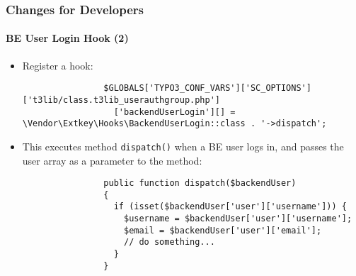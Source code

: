 \begin{frame}[fragile]
	\frametitle{Changes for Developers}
	\framesubtitle{BE User Login Hook (2)}

	\lstset{basicstyle=\tiny\ttfamily}

	\begin{itemize}
		\item Register a hook:

			\begin{lstlisting}
				$GLOBALS['TYPO3_CONF_VARS']['SC_OPTIONS']['t3lib/class.t3lib_userauthgroup.php']
				  ['backendUserLogin'][] = \Vendor\Extkey\Hooks\BackendUserLogin::class . '->dispatch';
			\end{lstlisting}

		\item This executes method \texttt{dispatch()} when a BE user logs in, and passes
			the user array as a parameter to the method:

			\begin{lstlisting}
				public function dispatch($backendUser)
				{
				  if (isset($backendUser['user']['username'])) {
				    $username = $backendUser['user']['username'];
				    $email = $backendUser['user']['email'];
				    // do something...
				  }
				}
			\end{lstlisting}

	\end{itemize}

\end{frame}

